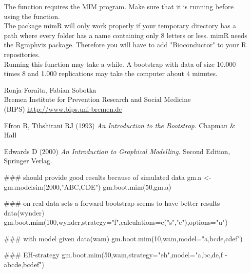 \begin{Note}\relax
The function requires the MIM program.
Make sure that it is running before using the function.\\ 
The package mimR will only work properly if your temporary directory has a path
where every folder has a name containing only 8 letters or less. mimR needs the Rgraphviz package. Therefore you will have to add "Bioconductor" to your R repositories.\\
Running this function may take a while. A bootstrap with
data of size 10.000 times 8 and 1.000 replications may take the computer about 4 minutes.
\end{Note}
\begin{Author}\relax
Ronja Foraita, Fabian Sobotka \\
Bremen Institute for Prevention Research and Social Medicine \\
(BIPS)  \url{http://www.bips.uni-bremen.de}
\end{Author}
\begin{References}\relax
Efron B, Tibshirani RJ (1993) 
\emph{An Introduction to the Bootstrap.}
Chapman \& Hall

Edwards D (2000) 
\emph{An Introduction to Graphical Modelling.}
Second Edition, Springer Verlag.
\end{References}
\begin{SeeAlso}\relax
{}
\end{SeeAlso}
\begin{Examples}
\begin{ExampleCode}
  ### should provide good results because of simulated data
  gm.a <- gm.modelsim(2000,"ABC,CDE")
  gm.boot.mim(50,gm.a)
  
  ### on real data sets a forward bootstrap seems to have better results
  data(wynder)
  gm.boot.mim(100,wynder,strategy="f",calculations=c("s","e"),options="u")
  
  ### with model given
  data(wam)
  gm.boot.mim(10,wam,model="a,bcde,cdef")
  
  ### EH-strategy
  gm.boot.mim(50,wam,strategy="eh",model="a,bc,de,f - abcde,bcdef")
\end{ExampleCode}
\end{Examples}

